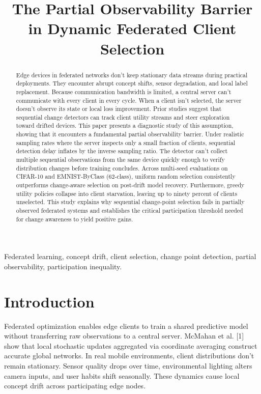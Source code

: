 \documentclass[conference]{IEEEtran}
\begin{document}
\title{The Partial Observability Barrier in Dynamic Federated Client Selection}

\author{
}

\maketitle

\begin{abstract}
Edge devices in federated networks don't keep stationary data streams during practical deployments. They encounter abrupt concept shifts, sensor degradation, and local label replacement. Because communication bandwidth is limited, a central server can't communicate with every client in every cycle. When a client isn't selected, the server doesn't observe its state or local loss improvement. Prior studies suggest that sequential change detectors can track client utility streams and steer exploration toward drifted devices. This paper presents a diagnostic study of this assumption, showing that it encounters a fundamental partial observability barrier. Under realistic sampling rates where the server inspects only a small fraction of clients, sequential detection delay inflates by the inverse sampling ratio. The detector can't collect multiple sequential observations from the same device quickly enough to verify distribution changes before training concludes. Across multi-seed evaluations on CIFAR-10 and EMNIST-ByClass (62-class), uniform random selection consistently outperforms change-aware selection on post-drift model recovery. Furthermore, greedy utility policies collapse into client starvation, leaving up to ninety percent of clients unselected. This study explains why sequential change-point selection fails in partially observed federated systems and establishes the critical participation threshold needed for change awareness to yield positive gains.
\end{abstract}

\begin{IEEEkeywords}
Federated learning, concept drift, client selection, change point detection, partial observability, participation inequality.
\end{IEEEkeywords}

\section{Introduction}
Federated optimization enables edge clients to train a shared predictive model without transferring raw observations to a central server. McMahan et al. [1] show that local stochastic updates aggregated via coordinate averaging construct accurate global networks. In real mobile environments, client distributions don't remain stationary. Sensor quality drops over time, environmental lighting alters camera inputs, and user habits shift seasonally. These dynamics cause local concept drift across participating edge nodes.
\end{document}
